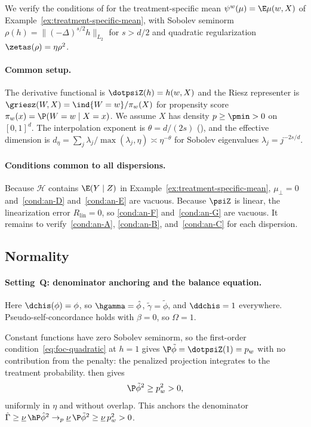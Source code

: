 \documentclass{article}
\begin{document}
We verify the conditions of 
for the treatment-specific mean
$\psi^w(\mu) = \E \mu(w, X)$
of Example~\ref{ex:treatment-specific-mean},
with Sobolev seminorm $\rho(h) = \|(-\Delta)^{s/2} h\|_{L_2}$
for $s > d/2$ and quadratic regularization
$\zetas(\rho) = \eta \rho^2$.

\paragraph{Common setup.}
The derivative functional is
$\dotpsiZ(h) = h(w, X)$ and the Riesz representer is
$\griesz(W,X) = \ind{W=w}/\pi_w(X)$
for propensity score $\pi_w(x) = \P(W=w \mid X=x)$.
We assume $X$ has density $p \ge \pmin > 0$
on $[0,1]^d$.
The interpolation exponent is $\theta = d/(2s)$
(),
and the effective dimension is
$d_\eta = \sum_j \lambda_j / \max(\lambda_j, \eta)
  \asymp \eta^{-\theta}$
for Sobolev eigenvalues $\lambda_j = j^{-2s/d}$.

\paragraph{Conditions common to all dispersions.}
Because $\mathcal{H}$ contains $\E(Y \mid Z)$
in Example~\ref{ex:treatment-specific-mean},
$\mu_\perp = 0$
and~\ref{cond:an-D} and~\ref{cond:an-E} are vacuous.
Because $\psiZ$ is linear,
the linearization error $R_{\mathrm{lin}} = 0$,
so \ref{cond:an-F} and~\ref{cond:an-G} are vacuous.
It remains to verify~\ref{cond:an-A},
\ref{cond:an-B}, and~\ref{cond:an-C} for each dispersion.

\subsection{Normality}

\paragraph{Setting~Q: denominator anchoring and the balance equation.}
Here $\dchis(\phi) = \phi$,
so $\hgamma = \hat\phi$,
$\tilde\gamma = \tilde\phi$,
and $\ddchis = 1$ everywhere.
Pseudo-self-concordance holds with $\beta = 0$,
so $\Omega = 1$.

Constant functions have zero Sobolev seminorm,
so the first-order condition~\eqref{eq:foc-quadratic} at $h = 1$
gives $\P\tilde\phi = \dotpsiZ(1) = p_w$
with no contribution from the penalty:
the penalized projection integrates
to the treatment probability.
 then gives
\begin{equation}
\label{eq:tsm-variance-lower}
\P\tilde\phi^2 \ge p_w^2 > 0,
\end{equation}
uniformly in $\eta$ and without overlap.
This anchors the denominator
$\hat\Gamma \ge \underline\nu\, \hP\hat\phi^2
  \to_p \underline\nu\, \P\tilde\phi^2
  \ge \underline\nu\, p_w^2 > 0$.
\end{document}
